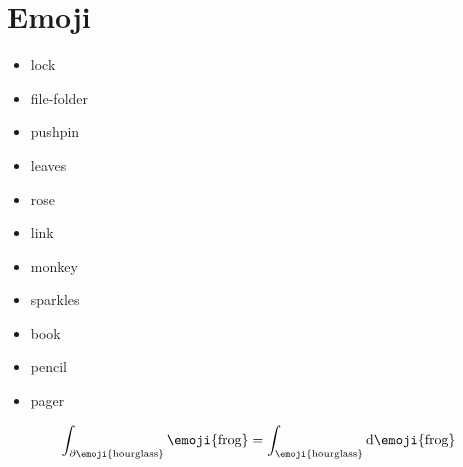 \documentclass[12pt]{article}
\begin{document}
\section{ Emoji }%
\label{sec:Emoji}

\begin{itemize}
	\item lock 
	\item file-folder  
	\item pushpin  
	\item leaves 
	\item rose 
	\item link 
	\item monkey 
	\item sparkles 
	\item book 
	\item pencil 
	\item pager 
\end{itemize}

$$
	\int_{\partial\text{\emoji{hourglass}}} \text{\emoji{frog}}
	= \int_\text{\emoji{hourglass}} \mathrm{d}\text{\emoji{frog}}
$$
\end{document}
